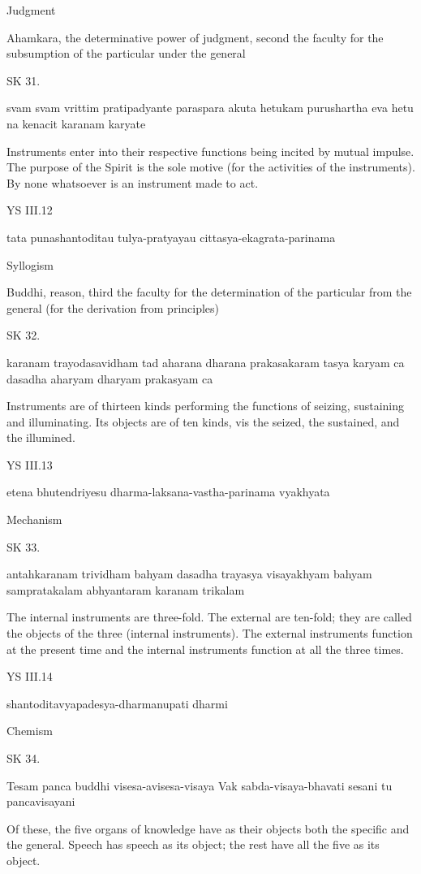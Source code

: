 Judgment

Ahamkara, the determinative power of judgment, second the faculty for the subsumption of the particular under the general

SK 31.

svam svam vrittim pratipadyante paraspara akuta hetukam
purushartha eva hetu na kenacit karanam karyate

Instruments enter into their respective functions being incited by mutual impulse.
The purpose of the Spirit is the sole motive (for the activities of the instruments).
By none whatsoever is an instrument made to act.

YS III.12

tata punashantoditau tulya-pratyayau cittasya-ekagrata-parinama

Syllogism

Buddhi, reason, third the faculty for the determination of the particular from the general (for the derivation from principles)

SK 32.

karanam trayodasavidham tad aharana dharana prakasakaram
tasya karyam ca dasadha aharyam dharyam prakasyam ca

Instruments are of thirteen kinds performing the functions of
seizing, sustaining and illuminating.
Its objects are of ten kinds, vis
the seized, the sustained, and the illumined.

YS III.13

etena bhutendriyesu dharma-laksana-vastha-parinama vyakhyata

Mechanism

SK 33.

antahkaranam trividham bahyam dasadha trayasya visayakhyam
bahyam sampratakalam abhyantaram karanam trikalam

The internal instruments are three-fold.
The external are ten-fold; they are called the objects of the three (internal instruments).
The external instruments function at the present time and
the internal instruments function at all the three times.

YS III.14

shantoditavyapadesya-dharmanupati dharmi

Chemism

SK 34.

Tesam panca buddhi visesa-avisesa-visaya
Vak sabda-visaya-bhavati sesani tu pancavisayani

Of these, the five organs of knowledge have as their objects
both the specific and the general.
Speech has speech as its object;
the rest have all the five as its object.

